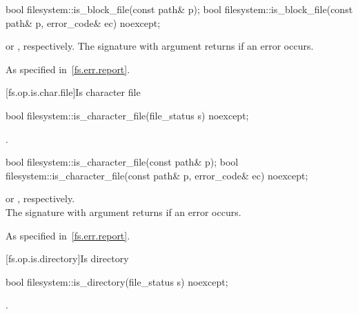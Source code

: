 %
\begin{itemdecl}
bool filesystem::is_block_file(const path& p);
bool filesystem::is_block_file(const path& p, error_code& ec) noexcept;
\end{itemdecl}

\begin{itemdescr}
\pnum
\returns
{} or , respectively.
The signature with argument  returns  if an error occurs.

\pnum
\throws
As specified in~\ref{fs.err.report}.
\end{itemdescr}


[fs.op.is.char.file]{Is character file}

%
\begin{itemdecl}
bool filesystem::is_character_file(file_status s) noexcept;
\end{itemdecl}

\begin{itemdescr}
\pnum
\returns
{}.
\end{itemdescr}

%
\begin{itemdecl}
bool filesystem::is_character_file(const path& p);
bool filesystem::is_character_file(const path& p, error_code& ec) noexcept;
\end{itemdecl}

\begin{itemdescr}
\pnum
\returns
{}
  or ,
  respectively.\\The signature with argument  returns 
  if an error occurs.

\pnum
\throws
As specified in~\ref{fs.err.report}.
\end{itemdescr}


[fs.op.is.directory]{Is directory}

%
\begin{itemdecl}
bool filesystem::is_directory(file_status s) noexcept;
\end{itemdecl}

\begin{itemdescr}
\pnum
\returns
{}.
\end{itemdescr}

